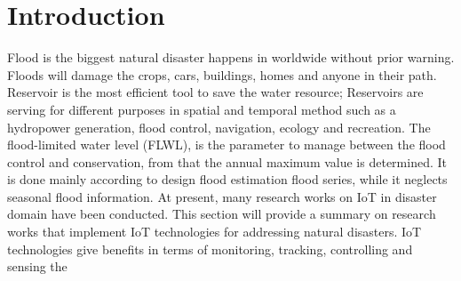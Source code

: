 \documentclass[a4paper,12pt]{report}
\begin{document}
\lhead{}


\rhead{\thepage}




\vspace{0.1in}
\vspace{0.1in}


\chapter {Introduction}
Flood is the biggest natural disaster happens in worldwide without prior warning. Floods will damage the crops, cars, buildings, homes and anyone in their path. Reservoir is the most efficient tool to save the water resource; Reservoirs are serving for different purposes in spatial and temporal method such as a hydropower generation, flood control, navigation, ecology and recreation. The flood-limited water level (FLWL), is the parameter to manage between the flood control and conservation, from that the annual maximum value is determined. It is done mainly according to design flood estimation flood series, while it neglects seasonal flood information. At present, many research works on IoT in disaster domain have been conducted. This section will provide a summary on research works that implement IoT technologies for addressing natural disasters. IoT technologies give benefits in terms of monitoring, tracking, controlling and sensing the 
\end{document}
